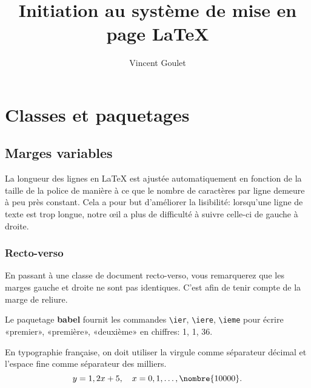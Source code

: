 \documentclass[11pt,french]{memoir}
\title{Initiation au système de mise en page \LaTeX}
\author{Vincent Goulet}
\begin{document}
\maketitle

\chapter{Classes et paquetages}

\section{Marges variables}

La longueur des lignes en {\LaTeX} est ajustée automatiquement en
fonction de la taille de la police de manière à ce que le nombre de
caractères par ligne demeure à peu près constant. Cela a pour but
d'améliorer la lisibilité: lorsqu'une ligne de texte est trop longue,
notre œil a plus de difficulté à suivre celle-ci de gauche à droite.

\subsection{Recto-verso}

En passant à une classe de document recto-verso, vous remarquerez que
les marges gauche et droite ne sont pas identiques. C'est afin de
tenir compte de la marge de reliure.

Le paquetage \textbf{babel} fournit les commandes \verb=\ier=,
\verb=\iere=, \verb=\ieme= pour écrire «premier», «première»,
«deuxième» en chiffres: 1{\ier}, 1{\iere}, 36{\ieme}.

En typographie française, on doit utiliser la virgule comme séparateur
décimal et l'espace fine comme séparateur des milliers.
\begin{displaymath}
  y = 1,2x + 5, \quad x = 0, 1, \dots, \nombre{10 000}.
\end{displaymath}
\end{document}

